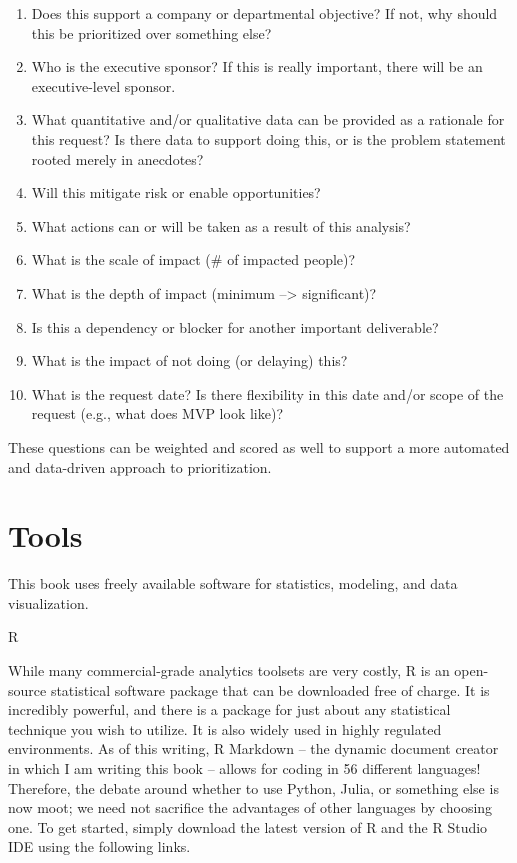 \documentclass[]{book}
\providecommand{\tightlist}{%
  \setlength{\itemsep}{0pt}\setlength{\parskip}{0pt}}
\begin{document}
\begin{enumerate}
\def\labelenumi{\arabic{enumi}.}
\tightlist
\item
  Does this support a company or departmental objective? If not, why should this be prioritized over something else?
\item
  Who is the executive sponsor? If this is really important, there will be an executive-level sponsor.
\item
  What quantitative and/or qualitative data can be provided as a rationale for this request? Is there data to support doing this, or is the problem statement rooted merely in anecdotes?
\item
  Will this mitigate risk or enable opportunities?
\item
  What actions can or will be taken as a result of this analysis?
\item
  What is the scale of impact (\# of impacted people)?
\item
  What is the depth of impact (minimum --\textgreater{} significant)?
\item
  Is this a dependency or blocker for another important deliverable?
\item
  What is the impact of not doing (or delaying) this?
\item
  What is the request date? Is there flexibility in this date and/or scope of the request (e.g., what does MVP look like)?
\end{enumerate}

These questions can be weighted and scored as well to support a more automated and data-driven approach to prioritization.

\hypertarget{tools}{%
\section{Tools}\label{tools}}

This book uses freely available software for statistics, modeling, and data visualization.

 R

While many commercial-grade analytics toolsets are very costly, R is an open-source statistical software package that can be downloaded free of charge. It is incredibly powerful, and there is a package for just about any statistical technique you wish to utilize. It is also widely used in highly regulated environments. As of this writing, R Markdown -- the dynamic document creator in which I am writing this book -- allows for coding in 56 different languages! Therefore, the debate around whether to use Python, Julia, or something else is now moot; we need not sacrifice the advantages of other languages by choosing one. To get started, simply download the latest version of R and the R Studio IDE using the following links.
\end{document}
